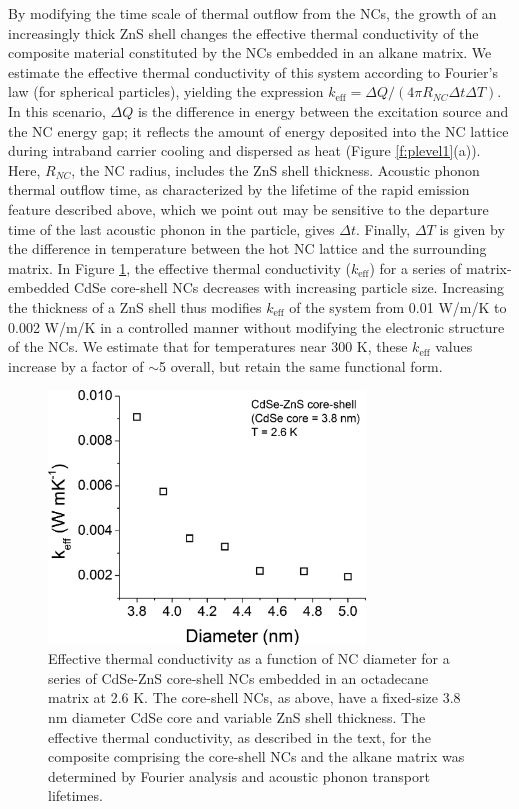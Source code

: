 By modifying the time scale of thermal outflow from the NCs, the growth of an increasingly thick ZnS shell changes the effective thermal conductivity of the composite material constituted by the NCs embedded in an alkane matrix. We estimate the effective thermal conductivity of this system according to Fourier’s law (for spherical particles), yielding the expression $k_{\mathrm{eff}} = \Delta Q/(4\pi R_{NC}\Delta t\Delta T)$.  In this scenario, $\Delta Q$ is the difference in energy between the excitation source and the NC energy gap; it reflects the amount of energy deposited into the NC lattice during intraband carrier cooling and dispersed as heat (Figure \ref{f:plevel1}(a)).  Here, $R_{NC}$, the NC radius, includes the ZnS shell thickness. Acoustic phonon thermal outflow time, as characterized by the lifetime of the rapid emission feature described above, which we point out may be sensitive to the departure time of the last acoustic phonon in the particle, gives $\Delta t$. Finally, $\Delta T$ is given by the difference in temperature between the hot NC lattice and the surrounding matrix. In Figure \ref{f:plevel4}, the effective thermal conductivity ($k_{\mathrm{eff}}$) for a series of matrix-embedded CdSe core-shell NCs decreases with increasing particle size. Increasing the thickness of a ZnS shell thus modifies $k_{\mathrm{eff}}$ of the system from 0.01 W/m/K to 0.002 W/m/K in a controlled manner without modifying the electronic structure of the NCs.  We estimate that for temperatures near 300 K, these $k_{\mathrm{eff}}$ values increase by a factor of $\sim$5 overall, but retain the same functional form.

\begin{figure}
\begin{center}
\includegraphics[width=0.75\textwidth]{./Chapter5/plevel4.jpeg}
\caption[Low-temperature effective thermal conductivity as a function of NC diameter for a series of CdSe-ZnS core-shell NCs embedded in an octadecane matrix.]{Effective thermal conductivity as a function of NC diameter for a series of CdSe-ZnS core-shell NCs embedded in an octadecane matrix at 2.6 K. The core-shell NCs, as above, have a fixed-size 3.8 nm diameter CdSe core and variable ZnS shell thickness. The effective thermal conductivity, as described in the text, for the composite comprising the core-shell NCs and the alkane matrix was determined by Fourier analysis and acoustic phonon transport lifetimes.}
\label{f:plevel4}
\end{center}
\end{figure}

